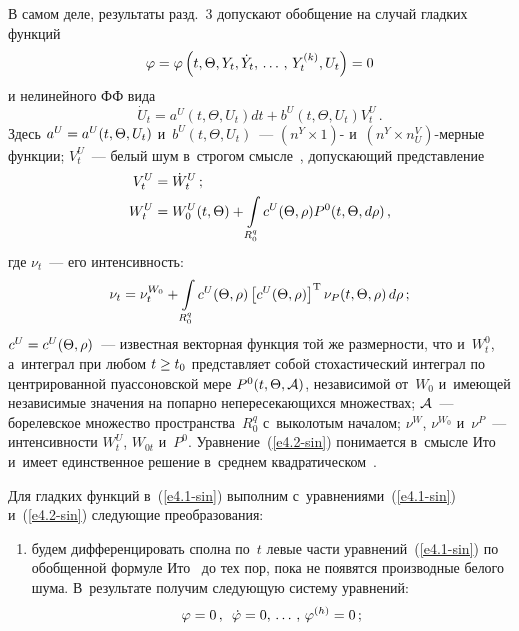 \begin{multicols}{2}
В самом деле, результаты разд.~3 допускают обобщение на случай гладких функций
\begin{equation}
\varphi =\varphi\left(t, \Theta, Y_t, \dot Y_t \tr Y_t^{(k)}, U_t\right) =0
    \label{e4.1-sin}
\end{equation}
и нелинейного ФФ вида
\begin{equation}
\dot U_t = a^U \left(t, \Theta,U_t\right) dt + b^U \left(t, \Theta,U_t\right) V_t^U\,.
\label{e4.2-sin}
\end{equation}
Здесь $a^U \hm= a^U(t, \Theta,U_t)$ и~$b^U(t, \Theta,U_t)$~--- 
$(n^Y\times 1)$- и~$(n^Y\times n_U^V)$-мер\-ные функции; $V_t^U$~--- 
белый шум в~строгом смысле~\cite{1-sin, 2-sin}, допускающий представление
    \begin{align*}
       V_t^U &= \dot W_t^U\,; \\
   W_t^U &= W_0^U (t,\Theta) + 
    \iii_{R_0^q} c^U (\Theta,\rho) P^0 (t,\Theta, d\rho)\,,
    \end{align*}
где $\nu_t$~--- его интенсивность:
   \begin{equation*}
   \nu_t =\nu_t^{W_0} +  \iii_{R_0^q} c^U (\Theta,\rho) 
    \left[c^U (\Theta,\rho)\right]^{\mathrm{T}} \nu_P (t,\Theta,\rho)\,d\rho\,;
    \end{equation*}
$c^U\hm = c^U(\Theta,\rho)$~--- 
известная векторная функция той же размерности, что и~$W_t^0$, 
а~интеграл при любом $t\hm\ge t_0$ представляет собой стохастический интеграл 
по центрированной пуассоновской мере $P^0(t,\Theta,\aa)$, независимой от~$W_0$ 
и~имеющей независимые значения на попарно непересекающихся множествах; $\aa$~--- 
борелевское множество пространства~$R_0^q$ с~выколотым началом; $\nu^W$, 
$\nu^{W_0}$ и~$\nu^P$~--- интенсивности $W_t^U$, $W_{0t}$ и~$P^0$. 
Уравнение~(\ref{e4.2-sin}) понимается в~смысле Ито и~имеет единственное решение 
в~среднем квадратическом~\cite{1-sin, 2-sin}.


Для гладких функций в~(\ref{e4.1-sin}) выполним с~уравнениями~(\ref{e4.1-sin}) 
и~(\ref{e4.2-sin}) следующие преобразования:
\begin{enumerate}[(1)]
\item будем дифференцировать сполна по~$t$ левые части уравнений~(\ref{e4.1-sin}) 
по обобщенной формуле Ито~\cite{1-sin, 2-sin} 
до тех пор, пока не появятся производные белого шума. 
В~результате получим следующую систему уравнений:
  \begin{equation}
  \varphi=0\,,\enskip \dot \varphi =0\tr \varphi^{(h)}=0\,;\label{e4.5-sin}
  \end{equation}


\end{enumerate}
\end{multicols}
